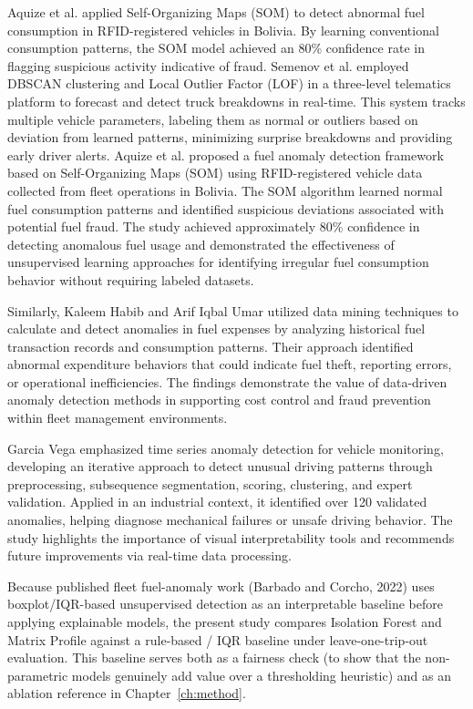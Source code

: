 Aquize et al. \cite{aquize2017self} applied Self-Organizing Maps (SOM) to detect abnormal fuel consumption in RFID-registered vehicles in Bolivia. By learning conventional consumption patterns, the SOM model achieved an 80\% confidence rate in flagging suspicious activity indicative of fraud. Semenov et al. \cite{semenov2024concept} employed DBSCAN clustering and Local Outlier Factor (LOF) in a three-level telematics platform to forecast and detect truck breakdowns in real-time. This system tracks multiple vehicle parameters, labeling them as normal or outliers based on deviation from learned patterns, minimizing surprise breakdowns and providing early driver alerts.
Aquize et al. \cite{aquize2017self} proposed a fuel anomaly detection framework based on Self-Organizing Maps (SOM) using RFID-registered vehicle data collected from fleet operations in Bolivia. The SOM algorithm learned normal fuel consumption patterns and identified suspicious deviations associated with potential fuel fraud. The study achieved approximately 80\% confidence in detecting anomalous fuel usage and demonstrated the effectiveness of unsupervised learning approaches for identifying irregular fuel consumption behavior without requiring labeled datasets.

Similarly, Kaleem Habib and Arif Iqbal Umar \cite{habib2015anomalies} utilized data mining techniques to calculate and detect anomalies in fuel expenses by analyzing historical fuel transaction records and consumption patterns. Their approach identified abnormal expenditure behaviors that could indicate fuel theft, reporting errors, or operational inefficiencies. The findings demonstrate the value of data-driven anomaly detection methods in supporting cost control and fraud prevention within fleet management environments.

Garcia Vega \cite{garcia2022development} emphasized time series anomaly detection for vehicle monitoring, developing an iterative approach to detect unusual driving patterns through preprocessing, subsequence segmentation, scoring, clustering, and expert validation. Applied in an industrial context, it identified over 120 validated anomalies, helping diagnose mechanical failures or unsafe driving behavior. The study highlights the importance of visual interpretability tools and recommends future improvements via real-time data processing.

Because published fleet fuel-anomaly work (Barbado and Corcho, 2022) \cite{barbado2022interpretable} uses boxplot/IQR-based unsupervised detection as an interpretable baseline before applying explainable models, the present study compares Isolation Forest and Matrix Profile against a rule-based / IQR baseline under leave-one-trip-out evaluation. This baseline serves both as a fairness check (to show that the non-parametric models genuinely add value over a thresholding heuristic) and as an ablation reference in Chapter~\ref{ch:method}.

